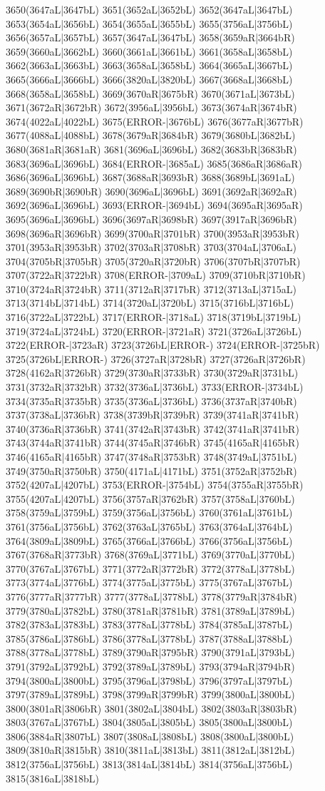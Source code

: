 3650(3647aL|3647bL) 3651(3652aL|3652bL) 3652(3647aL|3647bL) 3653(3654aL|3656bL) 3654(3655aL|3655bL) 3655(3756aL|3756bL) 3656(3657aL|3657bL) 3657(3647aL|3647bL) 3658(3659aR|3664bR) 3659(3660aL|3662bL) 3660(3661aL|3661bL) 3661(3658aL|3658bL) 3662(3663aL|3663bL) 3663(3658aL|3658bL) 3664(3665aL|3667bL) 3665(3666aL|3666bL) 3666(3820aL|3820bL) 3667(3668aL|3668bL) 3668(3658aL|3658bL) 3669(3670aR|3675bR) 3670(3671aL|3673bL) 3671(3672aR|3672bR) 3672(3956aL|3956bL) 3673(3674aR|3674bR) 3674(4022aL|4022bL) 3675(ERROR-|3676bL) 3676(3677aR|3677bR) 3677(4088aL|4088bL) 3678(3679aR|3684bR) 3679(3680bL|3682bL) 3680(3681aR|3681aR) 3681(3696aL|3696bL) 3682(3683bR|3683bR) 3683(3696aL|3696bL) 3684(ERROR-|3685aL) 3685(3686aR|3686aR) 3686(3696aL|3696bL) 3687(3688aR|3693bR) 3688(3689bL|3691aL) 3689(3690bR|3690bR) 3690(3696aL|3696bL) 3691(3692aR|3692aR) 3692(3696aL|3696bL) 3693(ERROR-|3694bL) 3694(3695aR|3695aR) 3695(3696aL|3696bL) 3696(3697aR|3698bR) 3697(3917aR|3696bR) 3698(3696aR|3696bR) 3699(3700aR|3701bR) 3700(3953aR|3953bR) 3701(3953aR|3953bR) 3702(3703aR|3708bR) 3703(3704aL|3706aL) 3704(3705bR|3705bR) 3705(3720aR|3720bR) 3706(3707bR|3707bR) 3707(3722aR|3722bR) 3708(ERROR-|3709aL) 3709(3710bR|3710bR) 3710(3724aR|3724bR) 3711(3712aR|3717bR) 3712(3713aL|3715aL) 3713(3714bL|3714bL) 3714(3720aL|3720bL) 3715(3716bL|3716bL) 3716(3722aL|3722bL) 3717(ERROR-|3718aL) 3718(3719bL|3719bL) 3719(3724aL|3724bL) 3720(ERROR-|3721aR) 3721(3726aL|3726bL) 3722(ERROR-|3723aR) 3723(3726bL|ERROR-) 3724(ERROR-|3725bR) 3725(3726bL|ERROR-) 3726(3727aR|3728bR) 3727(3726aR|3726bR) 3728(4162aR|3726bR) 3729(3730aR|3733bR) 3730(3729aR|3731bL) 3731(3732aR|3732bR) 3732(3736aL|3736bL) 3733(ERROR-|3734bL) 3734(3735aR|3735bR) 3735(3736aL|3736bL) 3736(3737aR|3740bR) 3737(3738aL|3736bR) 3738(3739bR|3739bR) 3739(3741aR|3741bR) 3740(3736aR|3736bR) 3741(3742aR|3743bR) 3742(3741aR|3741bR) 3743(3744aR|3741bR) 3744(3745aR|3746bR) 3745(4165aR|4165bR) 3746(4165aR|4165bR) 3747(3748aR|3753bR) 3748(3749aL|3751bL) 3749(3750aR|3750bR) 3750(4171aL|4171bL) 3751(3752aR|3752bR) 3752(4207aL|4207bL) 3753(ERROR-|3754bL) 3754(3755aR|3755bR) 3755(4207aL|4207bL) 3756(3757aR|3762bR) 3757(3758aL|3760bL) 3758(3759aL|3759bL) 3759(3756aL|3756bL) 3760(3761aL|3761bL) 3761(3756aL|3756bL) 3762(3763aL|3765bL) 3763(3764aL|3764bL) 3764(3809aL|3809bL) 3765(3766aL|3766bL) 3766(3756aL|3756bL) 3767(3768aR|3773bR) 3768(3769aL|3771bL) 3769(3770aL|3770bL) 3770(3767aL|3767bL) 3771(3772aR|3772bR) 3772(3778aL|3778bL) 3773(3774aL|3776bL) 3774(3775aL|3775bL) 3775(3767aL|3767bL) 3776(3777aR|3777bR) 3777(3778aL|3778bL) 3778(3779aR|3784bR) 3779(3780aL|3782bL) 3780(3781aR|3781bR) 3781(3789aL|3789bL) 3782(3783aL|3783bL) 3783(3778aL|3778bL) 3784(3785aL|3787bL) 3785(3786aL|3786bL) 3786(3778aL|3778bL) 3787(3788aL|3788bL) 3788(3778aL|3778bL) 3789(3790aR|3795bR) 3790(3791aL|3793bL) 3791(3792aL|3792bL) 3792(3789aL|3789bL) 3793(3794aR|3794bR) 3794(3800aL|3800bL) 3795(3796aL|3798bL) 3796(3797aL|3797bL) 3797(3789aL|3789bL) 3798(3799aR|3799bR) 3799(3800aL|3800bL) 3800(3801aR|3806bR) 3801(3802aL|3804bL) 3802(3803aR|3803bR) 3803(3767aL|3767bL) 3804(3805aL|3805bL) 3805(3800aL|3800bL) 3806(3884aR|3807bL) 3807(3808aL|3808bL) 3808(3800aL|3800bL) 3809(3810aR|3815bR) 3810(3811aL|3813bL) 3811(3812aL|3812bL) 3812(3756aL|3756bL) 3813(3814aL|3814bL) 3814(3756aL|3756bL) 3815(3816aL|3818bL) 